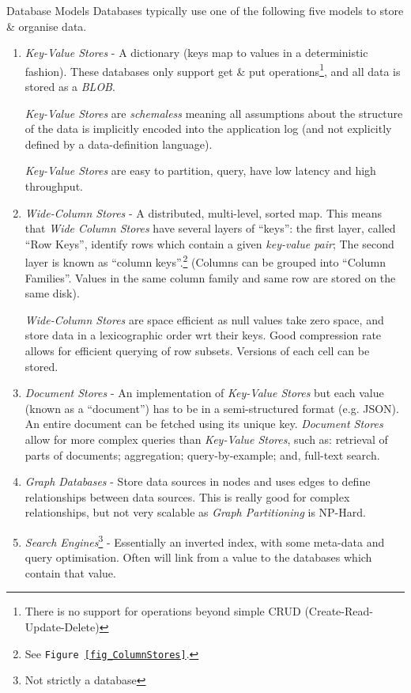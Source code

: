 \documentclass[11pt,a4paper]{article}
\begin{document}
  \begin{definition}{Database Models}
    Databases typically use one of the following five models to store \& organise data.
    \begin{enumerate}
      \item \textit{Key-Value Stores} - A dictionary (keys map to values in a deterministic fashion). These databases only support get \& put operations\footnote{There is no support for operations beyond simple CRUD (Create-Read-Update-Delete)}, and all data is stored as a \textit{BLOB}.
      \par \textit{Key-Value Stores} are \textit{schemaless} meaning all assumptions about the structure of the data is implicitly encoded into the application log (and not explicitly defined by a data-definition language).
      \par \textit{Key-Value Stores} are easy to partition, query, have low latency and high throughput.

      \item \textit{Wide-Column Stores} - A distributed, multi-level, sorted map. This means that \textit{Wide Column Stores} have several layers of ``keys'': the first layer, called ``Row Keys'', identify rows which contain a given \textit{key-value pair}; The second layer is known as ``column keys''.\footnote{See \texttt{Figure \ref{fig_ColumnStores}}.} (Columns can be grouped into ``Column Families''. Values in the same column family and same row are stored on the same disk).
      \par \textit{Wide-Column Stores} are space efficient as null values take zero space, and store data in a lexicographic order wrt their keys. Good compression rate allows for efficient querying of row subsets. Versions of each cell can be stored.

      \item \textit{Document Stores} - An implementation of \textit{Key-Value Stores} but each value (known as a ``document'') has to be in a semi-structured format (e.g. JSON). An entire document can be fetched using its unique key. \textit{Document Stores} allow for more complex queries than \textit{Key-Value Stores}, such as: retrieval of parts of documents; aggregation; query-by-example; and, full-text search.

      \item \textit{Graph Databases} - Store data sources in nodes and uses edges to define relationships between data sources. This is really good for complex relationships, but not very scalable as \textit{Graph Partitioning} is NP-Hard.

      \item \textit{Search Engines}\footnote{Not strictly a database} - Essentially an inverted index, with some meta-data and query optimisation. Often will link from a value to the databases which contain that value.
    \end{enumerate}
  \end{definition}
\end{document}
